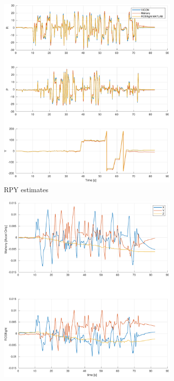 \documentclass[a4paper]{article}
\begin{document}
\begin{figure}[H]
  \centering
  \begin{subfigure}[t]{0.31\textwidth}
    \includegraphics[width=\textwidth]{estrpy_accel_ext15.pdf}
    \caption{RPY estimates}
    \label{fig:scf_meas}
  \end{subfigure}\hfill
  \begin{subfigure}[t]{0.31\textwidth}
    \includegraphics[width=\textwidth]{estbias_accel_ext15.pdf}

\end{subfigure}
\end{figure}
\end{document}
